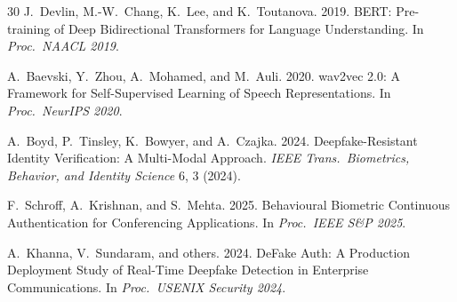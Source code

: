 \documentclass[sigconf,nonacm]{acmart}
\begin{document}
\begin{thebibliography}{30}
J.~Devlin, M.-W.~Chang, K.~Lee, and K.~Toutanova. 2019. BERT:
Pre-training of Deep Bidirectional Transformers for Language
Understanding. In \textit{Proc.\ NAACL 2019}.

A.~Baevski, Y.~Zhou, A.~Mohamed, and M.~Auli. 2020. wav2vec 2.0:
A Framework for Self-Supervised Learning of Speech Representations.
In \textit{Proc.\ NeurIPS 2020}.

A.~Boyd, P.~Tinsley, K.~Bowyer, and A.~Czajka. 2024. Deepfake-Resistant
Identity Verification: A Multi-Modal Approach. \textit{IEEE Trans.\
Biometrics, Behavior, and Identity Science} 6, 3 (2024).

F.~Schroff, A.~Krishnan, and S.~Mehta. 2025. Behavioural Biometric
Continuous Authentication for Conferencing Applications.
In \textit{Proc.\ IEEE S\&P 2025}.

A.~Khanna, V.~Sundaram, and others. 2024. DeFake Auth: A Production
Deployment Study of Real-Time Deepfake Detection in Enterprise
Communications. In \textit{Proc.\ USENIX Security 2024}.

\end{thebibliography}
\end{document}
